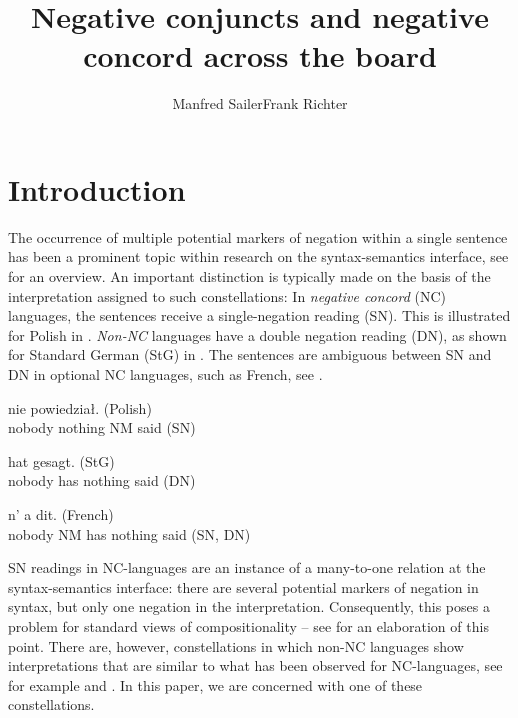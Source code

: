 \documentclass[output=paper]{langsci/langscibook}
\title{Negative conjuncts and negative concord across the board
}
\author{Manfred Sailer\affiliation{Goethe-Universität Frankfurt a.M.}\lastand Frank Richter\affiliation{Goethe-Universität Frankfurt a.M.}}
\begin{document}
\maketitle


\section{Introduction}
\label{Sec-Intro}

The occurrence of multiple potential markers of negation within a single sentence has been a prominent topic within research on the syntax-semantics interface, see \citet{Giannakidou:05} for an overview. 
An important distinction is typically made on the basis of the
interpretation assigned to such constellations: Ιn \emph{negative
  concord} (NC) languages, the sentences receive a single-negation
reading (SN). 
This is illustrated for Polish in . 
\emph{Non-NC} languages have a double negation reading (DN), as shown for Standard German (StG) in .
The sentences are ambiguous between SN and DN in optional NC languages, such as French, see .

\ea \label{ex-pl}
\gll {}  nie powiedział. (Polish)\\
nobody nothing NM said (SN)\\
\glt {}
\z

\ea \label{ex-de}
\gll {} hat  gesagt. (StG)\\
nobody has nothing said (DN)\\
\glt {}
\z 

\ea \label{ex-fr}
\gll {} n' a  dit. (French)\\
nobody NM has nothing said {(SN, DN)}\\
\z

SN readings in NC-languages are an instance of a many-to-one relation at the syntax-semantics interface: there are several potential markers of negation in syntax, but only one negation in the interpretation. Consequently, this poses a problem for standard views of compositionality -- see \citet{Sailer:16} for an elaboration of this point.
There are, however, constellations in which non-NC languages show interpretations that are similar to what has been observed for NC-languages, see for example \citet{Puskas:12} and \citet{Larrivee:16}.
In this paper, we are concerned with one of these constellations.
\end{document}
